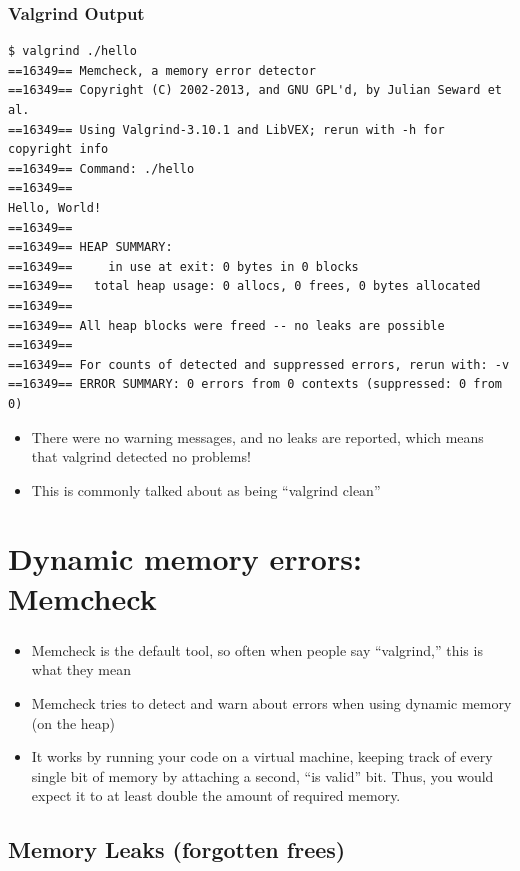 \documentclass{beamer}
\begin{document}
\begin{frame}[fragile]
  \frametitle{Valgrind Output}
  \begin{lstlisting}
$ valgrind ./hello
==16349== Memcheck, a memory error detector
==16349== Copyright (C) 2002-2013, and GNU GPL'd, by Julian Seward et al.
==16349== Using Valgrind-3.10.1 and LibVEX; rerun with -h for copyright info
==16349== Command: ./hello
==16349==
Hello, World!
==16349==
==16349== HEAP SUMMARY:
==16349==     in use at exit: 0 bytes in 0 blocks
==16349==   total heap usage: 0 allocs, 0 frees, 0 bytes allocated
==16349==
==16349== All heap blocks were freed -- no leaks are possible
==16349==
==16349== For counts of detected and suppressed errors, rerun with: -v
==16349== ERROR SUMMARY: 0 errors from 0 contexts (suppressed: 0 from 0)
\end{lstlisting}
\begin{itemize}
\item There were no warning messages, and no leaks are reported, which means that valgrind detected no problems!
\item This is commonly talked about as being ``valgrind clean'' 
\end{itemize}



\end{frame}


\section{Dynamic memory errors: Memcheck}
\begin{frame}[fragile]
  \frametitle{}

\begin{itemize}
  \item Memcheck is the default tool, so often when people say ``valgrind,'' this is what they mean
  \item Memcheck tries to detect and warn about errors when using dynamic memory (on the heap)
  \item It works by running your code on a virtual machine, keeping track of every single bit of memory by attaching a second, ``is valid'' bit. Thus, you would expect it to at least double the amount of required memory.
\end{itemize}
\end{frame}


\subsection{Memory Leaks (forgotten frees)}
\end{document}
